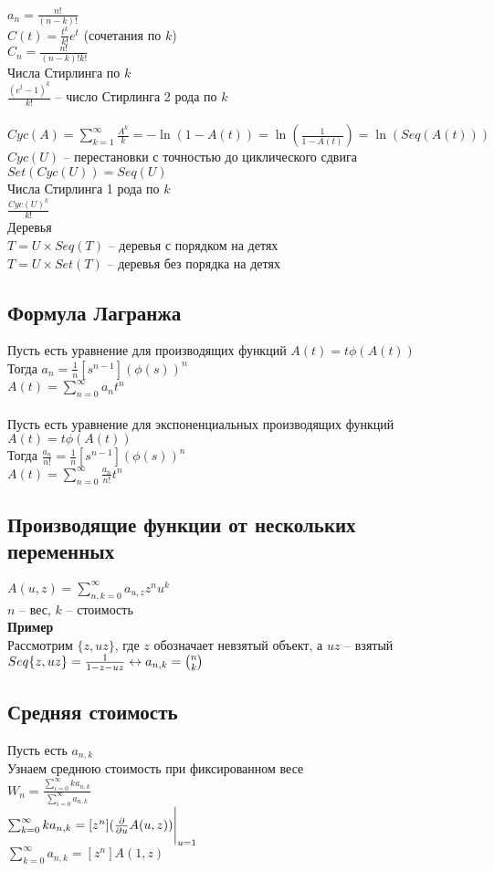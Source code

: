 \documentclass[12pt]{article}
\begin{document}
$a_n = \frac{n!}{(n-k)!}$\\
$C(t) = \frac{t^k}{k!} e^t$ (сочетания по $k$)\\
$C_n = \frac{n!}{(n-k)!k!}$\\
Числа Стирлинга по $k$\\
$\frac{(e^t - 1)^k}{k!}$ -- число Стирлинга 2 рода по $k$\\\\
$Cyc(A) = \sum_{k=1}^{\infty} \frac{A^k}{k} = -\ln(1 - A(t)) = \ln(\frac{1}{1-A(t)}) = \ln(Seq(A(t)))$\\
$Cyc(U)$ -- перестановки с точностью до циклического сдвига\\
$Set(Cyc (U)) = Seq (U)$\\
Числа Стирлинга 1 рода по $k$\\
$\frac{Cyc(U)^k}{k!}$\\
Деревья\\
$T = U \times Seq(T)$ -- деревья с порядком на детях\\
$T = U \times Set(T)$ -- деревья без порядка на детях
\subsection{Формула Лагранжа}
Пусть есть уравнение для производящих функций $A(t) = t \phi(A(t))$\\
Тогда $a_n = \frac1n [s^{n-1}] (\phi(s))^n$\\
$A(t) = \sum_{n=0}^{\infty} a_n t^n$\\\\
Пусть есть уравнение для экспоненциальных производящих функций $A(t) = t \phi(A(t))$\\
Тогда $\frac{a_n}{n!} = \frac1n [s^{n-1}] (\phi(s))^n$\\
$A(t) = \sum_{n=0}^{\infty} \frac{a_n}{n!} t^n$
\subsection{Производящие функции от нескольких переменных}
$A(u, z) = \sum_{n, k = 0}^\infty a_{u,z} z^n u^k$\\
$n$ -- вес, $k$ -- стоимость\\
\textbf{Пример}\\
Рассмотрим $\{z, uz\}$, где $z$ обозначает невзятый объект, а $uz$ -- взятый\\
$Seq\{z, uz\} = \frac{1}{1-z-uz} \leftrightarrow a_{n,k}=\binom nk$\\
\subsection{Средняя стоимость}
Пусть есть $a_{n,k}$\\
Узнаем среднюю стоимость при фиксированном весе\\
$W_n = \frac{\sum_{i=0}^\infty ka_{n,k}}{\sum_{i=0}^\infty a_{n,k}}$\\
$\sum_{k=0}^\infty ka_{n,k} = [z^n] (\frac{\partial}{\partial u} A(u, z))\Biggr|_{u=1}$\\
$\sum_{k=0}^\infty a_{n,k} = [z^n] A(1,z)$
\end{document}
